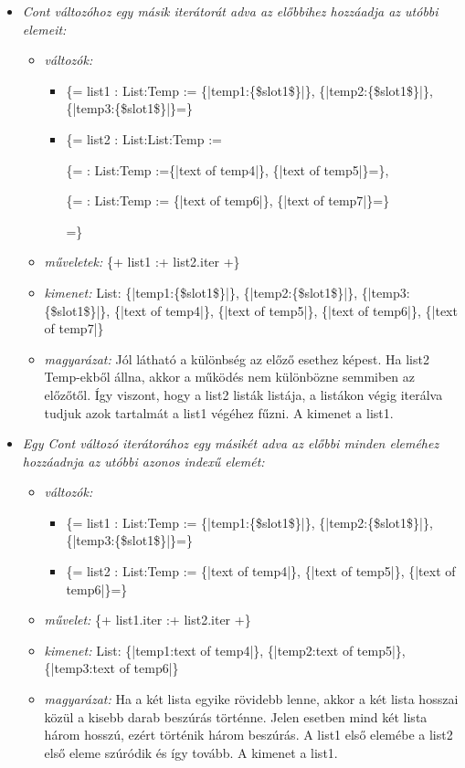 {\begin{itemize}
\item \emph{ Cont változóhoz egy másik iterátorát adva az előbbihez hozzáadja az utóbbi elemeit:}
\begin{itemize}
\item \emph{változók:}
\begin{itemize}
\item \{= list1 : List:Temp  := \{|temp1:\{\$slot1\$\}|\}, \{|temp2:\{\$slot1\$\}|\}, \{|temp3:\{\$slot1\$\}|\}=\}
\item \{= list2 : List:List:Temp  := 

		\{= : List:Temp :=\{|text of temp4|\}, \{|text of temp5|\}=\},
		
	 	\{= : List:Temp := \{|text of temp6|\}, \{|text of temp7|\}=\}
	 	
	 	=\}
\end{itemize}
\item \emph{műveletek:}
\{+ list1 :+ list2.iter +\}
\item \emph{kimenet:}
List: \{|temp1:\{\$slot1\$\}|\}, \{|temp2:\{\$slot1\$\}|\}, \{|temp3:\{\$slot1\$\}|\}, \{|text of temp4|\}, \{|text of temp5|\}, \{|text of temp6|\}, \{|text of temp7|\}
\item \emph{magyarázat:}
Jól látható a különbség az előző esethez képest.
Ha list2 Temp-ekből állna, akkor a működés nem különbözne semmiben az előzőtől.
Így viszont, hogy a list2 listák listája, a listákon végig iterálva tudjuk azok tartalmát a list1 végéhez fűzni.
A kimenet a list1.
\end{itemize}

\item \emph{ Egy Cont változó iterátorához egy másikét adva az előbbi minden eleméhez hozzáadnja az utóbbi azonos indexű elemét:}
\begin{itemize}
\item \emph{változók:}
\begin{itemize}
\item \{= list1 : List:Temp  := \{|temp1:\{\$slot1\$\}|\}, \{|temp2:\{\$slot1\$\}|\}, \{|temp3:\{\$slot1\$\}|\}=\}
\item \{= list2 : List:Temp  := \{|text of temp4|\}, \{|text of temp5|\}, \{|text of temp6|\}=\}
\end{itemize}
\item \emph{művelet:}
\{+ list1.iter :+ list2.iter +\}
\item \emph{kimenet:}
List: \{|temp1:text of temp4|\}, \{|temp2:text of temp5|\}, \{|temp3:text of temp6|\}
\item \emph{magyarázat:}
Ha a két lista egyike rövidebb lenne, akkor a két lista hosszai közül a kisebb darab beszúrás történne.
Jelen esetben mind két lista három hosszú, ezért történik három beszúrás.
A list1 első elemébe a list2 első eleme szúródik és így tovább.
A kimenet a list1.
\end{itemize}


\end{itemize}}
